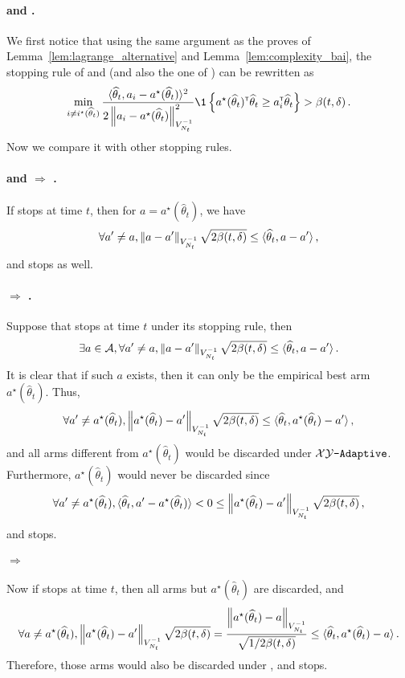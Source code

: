 \paragraph{\LG and \LGC.}
We first notice that using the same argument as the proves of Lemma~\ref{lem:lagrange_alternative} and Lemma~\ref{lem:complexity_bai}, the stopping rule of \LG and \LGC (and also the one of \GLUCB) can be rewritten as
\[
	\min_{i \neq i^\star(\hat{\theta}_{t})} \dfrac{\langle\hat\theta_t,a_{i}-a^\star(\hat\theta_t)\rangle^2}{2\normm{a_i - a^\star(\hat\theta_t)}_{{V_{N_t}^{-1}}}^2} \1\left\{a^\star(\hat\theta_t)^\top\hat\theta_t \geq a_i^\top\hat\theta_t\right\} > \beta(t,\delta)\,.
\]
Now we compare it with other stopping rules.

\paragraph{\LGC and \LG $\Rightarrow$ \XYS.}
If \LGC stops at time $t$, then for $a = a^\star(\hat\theta_t)$, we have
\[
    \forall a'\neq a, \left\lVert a-a'\right\rVert_{V_{N_t}^{-1}}\sqrt{2\beta(t,\delta)}\leq \langle\widehat\theta_t,a - a'\rangle\,,
\]
and \XYS stops as well.

\paragraph{\XYS $\Rightarrow$ \XYA.}
Suppose that \XYS stops at time $t$ under its stopping rule, then
\[
\exists a\in\mathcal{A}, \forall a'\neq a, \left\lVert a-a'\right\rVert_{V_{N_t}^{-1}}\sqrt{2\beta(t,\delta)}\leq \langle\widehat\theta_t,a - a'\rangle\,.
\]
It is clear that if such $a$ exists, then it can only be the empirical best arm $a^\star(\hat\theta_t)$. Thus,
\[
    \forall a'\neq a^\star(\widehat\theta_t), \left\lVert a^\star(\widehat\theta_t)-a'\right\rVert_{V_{N_t}^{-1}}\sqrt{2\beta(t,\delta)}\leq\langle\widehat\theta_t,a^\star(\widehat\theta_t)-a'\rangle\,,
\]
and all arms different from $a^\star(\hat\theta_t)$ would be discarded under $\texttt{$\mathcal{X}\mathcal{Y}$-Adaptive}$. Furthermore, $a^\star(\hat\theta_t)$ would never be discarded since
\[
    \forall a'\neq a^\star(\widehat\theta_t), \langle\widehat\theta_t,a'-a^\star(\widehat\theta_t)\rangle < 0 \le \left\lVert a^\star(\widehat\theta_t)-a'\right\rVert_{V_{N_t}^{-1}}\sqrt{2\beta(t,\delta)}\,,
\]
and \XYA stops.

\paragraph{\XYA $\Rightarrow$ \ALBA}
Now if \XYA stops at time $t$, then all arms but $a^\star(\hat\theta_t)$ are discarded, and
\[
    \forall a \neq a^\star(\widehat\theta_t), \left\lVert a^\star(\widehat\theta_t)-a'\right\rVert_{V_{N_t}^{-1}}\sqrt{2\beta(t,\delta)} = \dfrac{\left\lVert a^\star(\widehat\theta_t)-a\right\rVert_{V_{N_t}^{-1}}}{\sqrt{1/2\beta(t,\delta)}} \le \langle\widehat\theta_t,a^\star(\widehat\theta_t)-a\rangle\,.
\]
Therefore, those arms would also be discarded under \ALBA, and \ALBA stops.

